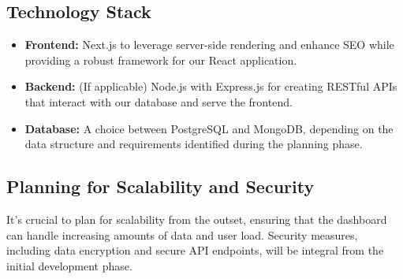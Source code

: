 \subsection*{Technology Stack}
\begin{itemize}
    \item \textbf{Frontend:} Next.js to leverage server-side rendering and enhance SEO while providing a robust framework for our React application.
    \item \textbf{Backend:} (If applicable) Node.js with Express.js for creating RESTful APIs that interact with our database and serve the frontend.
    \item \textbf{Database:} A choice between PostgreSQL and MongoDB, depending on the data structure and requirements identified during the planning phase.
\end{itemize}

\subsection*{Planning for Scalability and Security}
It's crucial to plan for scalability from the outset, ensuring that the dashboard can handle increasing amounts of data and user load. Security measures, including data encryption and secure API endpoints, will be integral from the initial development phase.

